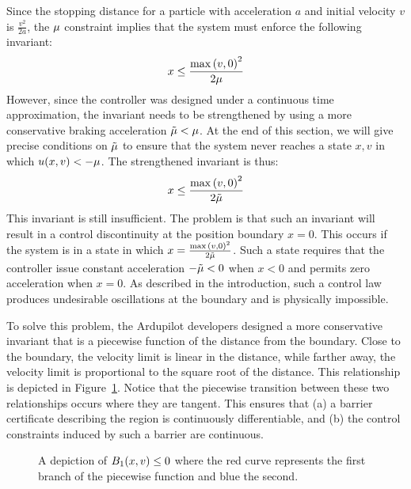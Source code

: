 Since the stopping distance for a particle with acceleration $a$ and
initial velocity $v$ is $\frac{v^2}{2a}$, the $\mu$ constraint implies
that the system must enforce the following invariant:
\[
x \leq \frac{\max{(v,0)}^2}{2\mu}
\]
However, since the controller was designed under a continuous time
approximation, the invariant needs to be strengthened by using a more
conservative braking acceleration $\tilde{\mu} < \mu$. At the end of this
section, we will give precise conditions on $\tilde{\mu}$ to ensure that the
system never reaches a state $x,v$ in which $u(x,v) < -\mu$. The
strengthened invariant is thus:
\[
x \leq \frac{\max{(v,0)}^2}{2\tilde{\mu}}
\]
This invariant is still insufficient. The problem is that such an invariant
will result in a control discontinuity at the position boundary $x =
0$. This occurs if the system is in a state in which $x =
\frac{\max{(v,0)}^2}{2\tilde{\mu}}$. Such a state requires that the controller
issue constant acceleration $-\tilde{\mu} < 0$ when $x < 0$ and permits zero
acceleration when $x = 0$. As described in the introduction, such a control
law produces undesirable oscillations at the boundary and is physically
impossible.

To solve this problem, the Ardupilot developers designed a more
conservative invariant that is a piecewise function of the distance from
the boundary. Close to the boundary, the velocity limit is linear in the
distance, while farther away, the velocity limit is proportional to the
square root of the distance. This relationship is depicted in
Figure~\ref{fig:sqrt-lin}. Notice that the piecewise transition between
these two relationships occurs where they are tangent. This ensures that
(a) a barrier certificate describing the region is continuously
differentiable, and (b) the control constraints induced by such a barrier
are continuous.

\begin{figure}
\centering
{}
\caption{A depiction of $B_1 (x,v) \leq 0$ where the red curve represents the first branch of the piecewise function and blue the second.}
\label{fig:sqrt-lin}
\end{figure}

